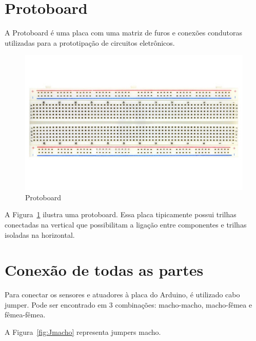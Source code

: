 \section{Protoboard}

A Protoboard é uma placa com uma matriz de furos e conexões condutoras utilizadas para a prototipação de circuitos eletrônicos.

\begin{figure}[ht]
      \centering
      \includegraphics[scale=0.50]{figuras/FProtoboard_2_M.jpg}
      \caption{Protoboard}
      \label{fig:protoboard}
\end{figure}

A Figura~\ref{fig:protoboard} ilustra uma protoboard. Essa placa tipicamente possui trilhas conectadas na vertical que possibilitam a ligação entre componentes e trilhas isoladas na horizontal. 

\section{Conexão de todas as partes}

Para conectar os sensores e atuadores à placa do Arduino, é utilizado cabo jumper. Pode ser encontrado em 3 combinações: macho-macho, macho-fêmea e fêmea-fêmea.

A Figura~\ref{fig:Jmacho} representa jumpers macho. 


